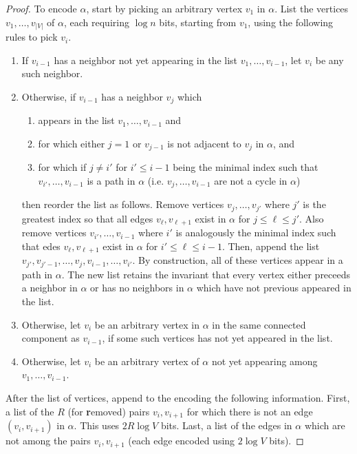 \begin{proof}
  To encode $\alpha$, start by picking an arbitrary vertex $v_1$ in $\alpha$.
  List the vertices $v_1,\ldots,v_{|V|}$ of $\alpha$, each requiring $\log n$ bits, starting from $v_1$, using the following rules to pick $v_i$.
  \begin{enumerate}
    \item  If $v_{i-1}$ has a neighbor not yet appearing in the list $v_1,\ldots,v_{i-1}$, let $v_i$ be any such neighbor.
    \item Otherwise, if $v_{i-1}$ has a neighbor $v_j$ which
    \begin{enumerate}
    \item appears in the list $v_1,\ldots,v_{i-1}$ and
    \item for which either $j = 1$ or $v_{j-1}$ is not adjacent to $v_j$ in $\alpha$, and
    \item for which if $j \neq i'$ for $i' \leq i-1$ being the minimal index such that $v_{i'},\ldots,v_{i-1}$ is a path in $\alpha$ (i.e. $v_j,\ldots,v_{i-1}$ are not a cycle in $\alpha$)
    \end{enumerate}
    then reorder the list as follows.
  Remove vertices $v_j,\ldots,v_{j'}$ where $j'$ is the greatest index so that all edges $v_{\ell},v_{\ell+1}$ exist in $\alpha$ for $j \leq \ell \leq j'$.
  Also remove vertices $v_{i'},\ldots,v_{i-1}$ where $i'$ is analogously the minimal index such that edes $v_{\ell},v_{\ell+1}$ exist in $\alpha$ for $i' \leq \ell \leq i-1$.
  Then, append the list $v_{j'},v_{j'-1},\ldots,v_j,v_{i-1},\ldots,v_{i'}$.
  By construction, all of these vertices appear in a path in $\alpha$.
  The new list retains the invariant that every vertex either preceeds a neighbor in $\alpha$ or has no neighbors in $\alpha$ which have not previous appeared in the list.
  \item
  Otherwise, let $v_i$ be an arbitrary vertex in $\alpha$ in the same connected component as $v_{i-1}$, if some such vertices has not yet appeared in the list.
  \item Otherwise, let $v_i$ be an arbitrary vertex of $\alpha$ not yet appearing among $v_1,\ldots,v_{i-1}$.
  \end{enumerate}
  After the list of vertices, append to the encoding the following information.
  First, a list of the $R$ (for \textbf{r}emoved) pairs $v_i,v_{i+1}$ for which there is not an edge $(v_i,v_{i+1})$ in $\alpha$.
  This uses $2 R \log V$ bits.
  Last, a list of the edges in $\alpha$ which are not among the pairs $v_i,v_{i+1}$ (each edge encoded using $2 \log V$ bits).


\end{proof}
